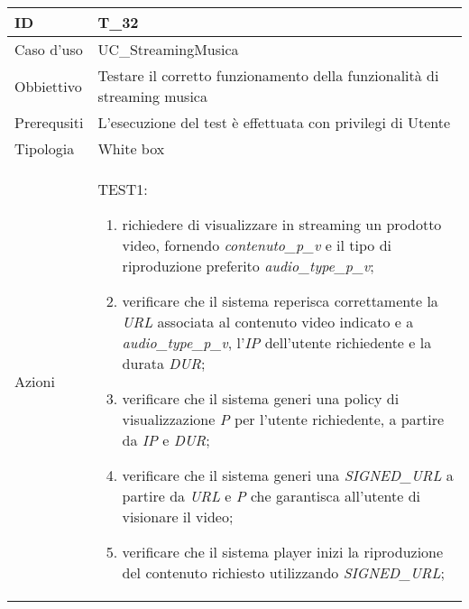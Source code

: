 \begin{table}[hb]
    \centering
    \begin{tabular}{ |p{2cm}|p{10cm}|  }
        \hline
        ID          & T\_32                                                                    \\\hline
        Caso d'uso  & UC\_StreamingMusica                                                      \\\hline
        Obbiettivo  & Testare il corretto funzionamento della funzionalità di streaming musica \\\hline
        Prerequsiti & L'esecuzione del test è effettuata con privilegi di Utente               \\\hline
        Tipologia   & White box                                                                \\\hline
        Azioni      &
        TEST1:
        \begin{enumerate}[nosep, topsep=0pt]
            \item richiedere di visualizzare in streaming un prodotto video, fornendo \emph{contenuto\_p\_v} e il tipo di riproduzione preferito \emph{audio\_type\_p\_v};
            \item verificare che il sistema reperisca correttamente la \emph{URL} associata al contenuto video indicato e a \emph{audio\_type\_p\_v}, l'\emph{IP} dell'utente richiedente e la durata \emph{DUR};
            \item verificare che il sistema generi una policy di visualizzazione \emph{P} per l'utente richiedente, a partire da \emph{IP} e \emph{DUR};
            \item verificare che il sistema generi una \emph{SIGNED\_URL} a partire da \emph{URL} e \emph{P} che garantisca all'utente di visionare il video;
            \item verificare che il sistema player inizi la riproduzione del contenuto richiesto utilizzando \emph{SIGNED\_URL};
        \end{enumerate}
        \\\hline
    \end{tabular}
\end{table}


